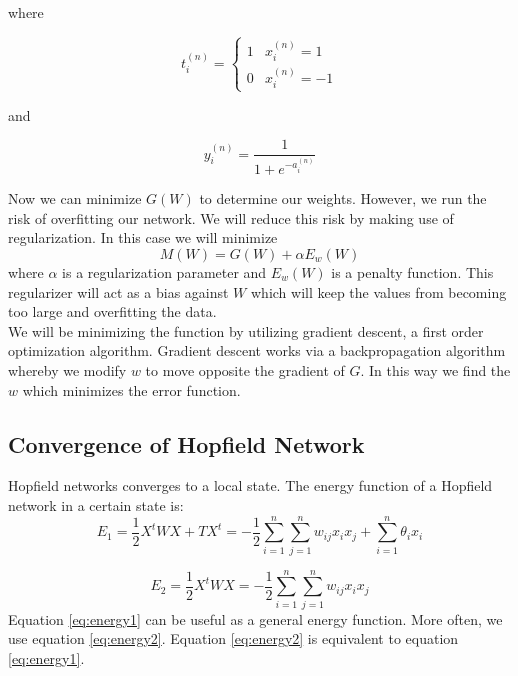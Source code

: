 where

\begin{equation}
\label{eq:opt2}
t_{i}^{(n)} = \begin{cases}
          1 & x_{i}^{(n)} = 1\\
          0 & x_{i}^{(n)} = -1
        \end{cases}
\end{equation}

and

\begin{equation}
\label{eq:opt3}
y_{i}^{(n)} = \frac{1}{1 + e^{-a_{i}^{(n)}}}
\end{equation}

Now we can minimize $G(W)$ to determine our weights. However, we run the risk of overfitting our network. We will reduce this risk by making use of regularization. In this case we will minimize 
\begin{equation}
\label{eq:opt4}
M(W) = G(W) + \alpha E_w(W)
\end{equation}
where $\alpha$ is a regularization parameter and $E_w(W)$ is a penalty function. This regularizer will act as a bias against $W$ which will keep the values from becoming too large and overfitting the data.\\

We will be minimizing the function by utilizing gradient descent, a first order optimization algorithm. Gradient descent works via a backpropagation algorithm whereby we modify $w$ to move opposite the gradient of $G$. In this way we find the $w$ which minimizes the error function.


\subsection{Convergence of Hopfield Network}
Hopfield networks converges to a local state. The energy function of a Hopfield network in a certain state is:
\begin{equation}
\label{eq:energy1}
E_1 = \frac{1}{2}X^tWX + TX^t = - \frac{1}{2}\sum_{i = 1}^{n}\sum_{j = 1}^{n}w_{ij} x_i x_j + \sum_{i = 1}^n \theta_i x_i
\end{equation}

\begin{equation}
\label{eq:energy2}
E_2 = \frac{1}{2}X^tWX = - \frac{1}{2}\sum_{i = 1}^{n}\sum_{j = 1}^{n}w_{ij} x_i x_j
\end{equation}
Equation \ref{eq:energy1} can be useful as a general energy function. More often, we use equation \ref{eq:energy2}. Equation \ref{eq:energy2} is equivalent to equation \ref{eq:energy1}.\\

